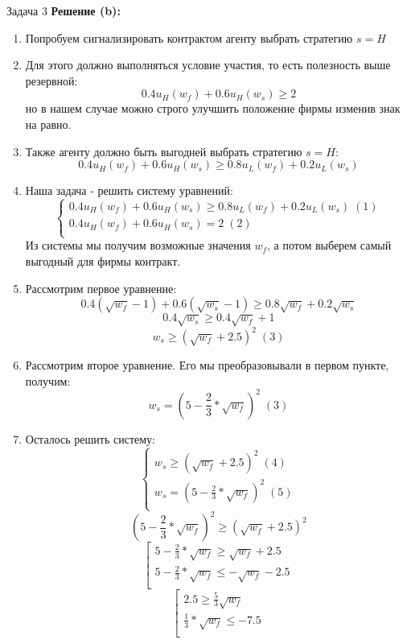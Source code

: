 \begin{mybox}{Задача 3}
    \textbf{Решение (b):}
    \begin{enumerate}
        \item Попробуем сигнализировать контрактом агенту выбрать стратегию $s=H$
        \item Для этого должно выполняться условие участия, то есть полезность выше резервной: $$0.4u_H(w_f)+0.6u_H(
        w_s)\geq2$$ но в нашем случае можно строго улучшить положение фирмы изменив знак на равно.
        \item Также агенту должно быть выгодней выбрать стратегию $s=H$: $$0.4u_H(w_f)+0.6u_H(w_s)\geq0.8u_L(w_f)+0
        .2u_L(w_s)$$
        \item Наша задача - решить систему уравнений: $$\begin{cases}
            0.4u_H(w_f)+0.6u_H(w_s)\geq0.8u_L(w_f)+0.2u_L(w_s) \;(1)\\
            0.4u_H(w_f)+0.6u_H(w_s)=2\; (2) \\
        \end{cases}$$
        Из системы мы получим возможные значения $w_f$, а потом выберем самый выгодный для фирмы контракт.
        \item Рассмотрим первое уравнение: $$0.4(\sqrt{w_f}-1)+0.6(\sqrt{w_s}-1)\geq0.8\sqrt{w_f}+0.2\sqrt{w_s}$$
        $$0.4\sqrt{w_s}\geq0.4\sqrt{w_f}+1$$
        $$w_s\geq(\sqrt{w_f}+2.5)^2\; (3)$$
        \item Рассмотрим второе уравнение. Его мы преобразовывали в первом пункте, получим: $$w_s=(5-\frac{2}{3}*\sqrt{w_f})^2\;(3)$$
        \item Осталось решить систему: $$\begin{cases}
            w_s\geq(\sqrt{w_f}+2.5)^2\; (4) \\
            w_s=(5-\frac{2}{3}*\sqrt{w_f})^2\;(5) \\
        \end{cases}$$
        $$(5-\frac{2}{3}*\sqrt{w_f})^2\geq(\sqrt{w_f}+2.5)^2$$
        $$\left[
          \begin{gathered}
              5-\frac{2}{3}*\sqrt{w_f}\geq\sqrt{w_f}+2.5 \\
              5-\frac{2}{3}*\sqrt{w_f}\leq-\sqrt{w_f}-2.5 \\
          \end{gathered}
        \right.$$
        $$\left[
          \begin{gathered}
              2.5\geq\frac{5}{3}\sqrt{w_f} \\
              \frac{1}{3}*\sqrt{w_f}\leq-7.5 \\

\end{gathered}$$
\end{enumerate}
\end{mybox}
